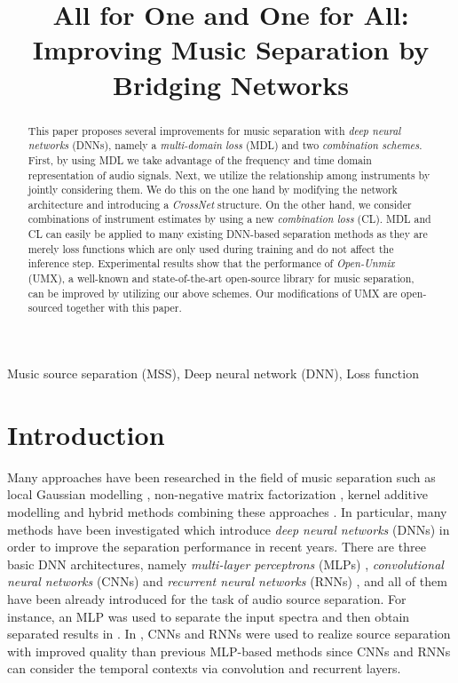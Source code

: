 \documentclass{article}
\title{All for One and One for All:\\Improving Music Separation by Bridging Networks}
\begin{document}
\ninept
\maketitle
\begin{abstract}
This paper proposes several improvements for music separation with \emph{deep neural networks} (DNNs), namely a \emph{multi-domain loss} (MDL) and two \emph{combination schemes}.
First, by using MDL we take advantage of the frequency and time domain representation of audio signals.
Next, we utilize the relationship among instruments by jointly considering them. We do this on the one hand by modifying the network architecture and introducing a \emph{CrossNet} structure. On the other hand, we consider combinations of instrument estimates by using a new \emph{combination loss} (CL).
MDL and CL can easily be applied to many existing DNN-based separation methods as they are merely loss functions which are only used during training and do not affect the inference step.
Experimental results show that the performance of \emph{Open-Unmix} (UMX), a well-known and state-of-the-art open-source library for music separation, can be improved by utilizing our above schemes.
Our modifications of UMX are open-sourced together with this paper.
\end{abstract}
\begin{keywords}
Music source separation (MSS), Deep neural network (DNN), Loss function
\end{keywords}
\vspace{-1mm}
\section{Introduction}
\label{sec:intro}
\vspace{-1mm}
Many approaches have been researched in the field of music separation such as local Gaussian modelling \cite{mss_gmodel_1, mss_gmodel_2}, non-negative matrix factorization \cite{mss_nmf_1, mss_nmf_2, mss_nmf_3}, kernel additive modelling \cite{mss_kernel_additive_1} and hybrid methods combining these approaches \cite{mss_combi_1, mss_combi_2}.
In particular, many methods have been investigated which introduce \emph{deep neural networks} (DNNs) in order to improve the separation performance in recent years.
There are three basic DNN architectures, namely \emph{multi-layer perceptrons} (MLPs) \cite{mlp_org}, \emph{convolutional neural networks} (CNNs) \cite{cnn_org} and \emph{recurrent neural networks} (RNNs) \cite{rnn_org}, and all of them have been already introduced for the task of audio source separation.
For instance, an MLP was used to separate the input spectra and then obtain separated results in \cite{mss_mlp_1, mss_mlp_2}.
In \cite{mss_cnn_1, mss_rnn_1}, CNNs and RNNs were used to realize source separation with improved quality than previous MLP-based methods since CNNs and RNNs can consider the temporal contexts via convolution and recurrent layers. 
\end{document}
